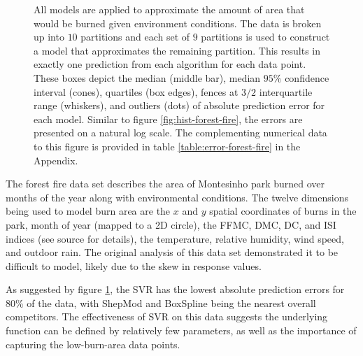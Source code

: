 \documentclass[smallextended,final]{svjour3}       %
\begin{document}
\begin{figure}
  \centering
  \caption{All models are applied to approximate the amount of area that would be burned given environment conditions. The data is broken up into $10$ partitions and each set of $9$ partitions is used to construct a model that approximates the remaining partition. This results in exactly one prediction from each algorithm for each data point. These boxes depict the median (middle bar), median $95\%$ confidence interval (cones), quartiles (box edges), fences at $3/2$ interquartile range (whiskers), and outliers (dots) of absolute prediction error for each model. Similar to figure \ref{fig:hist-forest-fire}, the errors are presented on a natural log scale. The complementing numerical data to this figure is provided in table \ref{table:error-forest-fire} in the Appendix.}
  \label{fig:error-forest-fire}
\end{figure}


The forest fire data set \cite{cortez2007data} describes the area of Montesinho park burned over months of the year along with environmental conditions. The twelve dimensions being used to model burn area are the $x$ and $y$ spatial coordinates of burns in the park, month of year (mapped to a 2D circle), the FFMC, DMC, DC, and ISI indices (see source for details), the temperature, relative humidity, wind speed, and outdoor rain. The original analysis of this data set demonstrated it to be difficult to model, likely due to the skew in response values.

As suggested by figure \ref{fig:error-forest-fire}, the SVR has the lowest absolute prediction errors for 80\% of the data, with ShepMod and BoxSpline being the nearest overall competitors. The effectiveness of SVR on this data suggests the underlying function can be defined by relatively few parameters, as well as the importance of capturing the low-burn-area data points.
\end{document}
